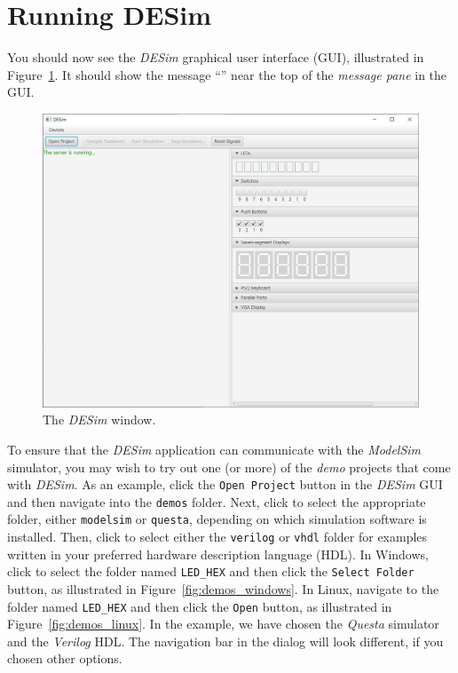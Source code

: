 \documentclass[11pt, twoside, pdftex]{article}
\begin{document}
\section{Running DESim}

You should now see the {\it DESim} graphical user interface (GUI),
illustrated in Figure~\ref{fig:GUI}. It should show the message
``'' near the top of the {\it message pane} in the GUI.

\begin{figure}[h]
	\begin{center}
		\includegraphics[width = \textwidth]{figures/DESim_GUI.png}
	\end{center}
          \caption{The {\it DESim} window.}
	\label{fig:GUI}
\end{figure}


To ensure that the {\it DESim} application can communicate with the {\it ModelSim} simulator, you
may wish to try out one (or more) of the {\it demo} projects that come with {\it DESim}. As
an example, click the \texttt{Open Project} button in the {\it DESim} GUI and then navigate into
the \texttt{demos} folder. Next, click to select the appropriate folder, either \texttt{modelsim} 
or \texttt{questa}, depending on which simulation software is installed. Then, click to select 
either the \texttt{verilog} or \texttt{vhdl} folder for examples written in your preferred 
hardware description language (HDL). In Windows, click to select the folder named \texttt{LED\_HEX} 
and then click the \texttt{Select Folder} button, as illustrated in Figure~\ref{fig:demos_windows}.
In Linux, navigate to the folder named \texttt{LED\_HEX} and then click the
\texttt{Open} button, as illustrated in Figure~\ref{fig:demos_linux}.
In the example, we have chosen the {\it Questa} simulator and the {\it Verilog} HDL. 
The navigation bar in the dialog will look different, if you chosen other options.
\end{document}
